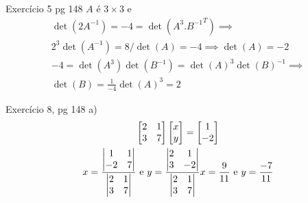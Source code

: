 \documentclass{beamer}
\begin{document}
\begin{frame}{Exercício 5 pg 148}
  $A$ é $3\times 3$ e
  \begin{gather*}
    \det(2A^{-1})=-4 = \det(A^3.{B^{-1}}^T) \implies \\
    2^3\det(A^{-1}) = 8/\det(A)=-4 \implies \det(A) = -2 \\
    -4 = \det(A^3)\det(B^{-1}) = \det(A)^3\det(B)^{-1} \implies \\
    \det(B) = \frac{1}{-4}\det(A)^3 = 2
  \end{gather*}
\end{frame}

\begin{frame}{Exercício 8, pg 148}
  a)
\begin{gather*}
  \begin{bmatrix}
    2 & 1 \\ 3 & 7
  \end{bmatrix}\begin{bmatrix}
    x \\ y
  \end{bmatrix}=\begin{bmatrix}
    1 \\ -2
  \end{bmatrix} \\
x={ \begin{vmatrix}
  1 & 1 \\
  -2 & 7
\end{vmatrix} \over \begin{vmatrix}
  2 & 1 \\ 3 & 7
\end{vmatrix}} \text{ e }y={ \begin{vmatrix}
  2 & 1 \\
  3 & -2
\end{vmatrix} \over \begin{vmatrix}
  2 & 1 \\ 3 & 7
\end{vmatrix}}
x=\frac{9}{11} \text{ e } y = \frac{-7}{11}
\end{gather*}
\end{frame}
\end{document}
